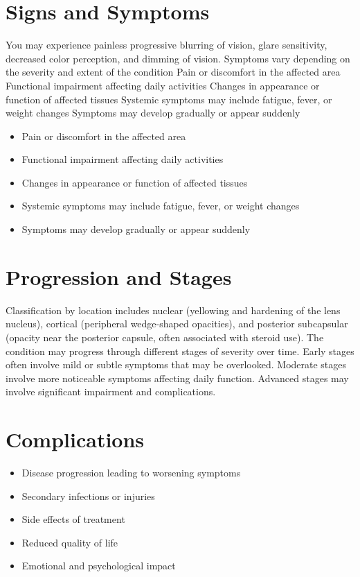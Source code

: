 \section{Signs and Symptoms}
You may experience painless progressive blurring of vision, glare sensitivity, decreased color perception, and dimming of vision. Symptoms vary depending on the severity and extent of the condition Pain or discomfort in the affected area Functional impairment affecting daily activities Changes in appearance or function of affected tissues Systemic symptoms may include fatigue, fever, or weight changes Symptoms may develop gradually or appear suddenly

\begin{itemize}[noitemsep]
  \item Pain or discomfort in the affected area
  \item Functional impairment affecting daily activities
  \item Changes in appearance or function of affected tissues
  \item Systemic symptoms may include fatigue, fever, or weight changes
  \item Symptoms may develop gradually or appear suddenly
\end{itemize}
\section{Progression and Stages}
Classification by location includes nuclear (yellowing and hardening of the lens nucleus), cortical (peripheral wedge-shaped opacities), and posterior subcapsular (opacity near the posterior capsule, often associated with steroid use). The condition may progress through different stages of severity over time. Early stages often involve mild or subtle symptoms that may be overlooked. Moderate stages involve more noticeable symptoms affecting daily function. Advanced stages may involve significant impairment and complications.
\section{Complications}
\begin{itemize}[noitemsep]
  \item Disease progression leading to worsening symptoms
  \item Secondary infections or injuries
  \item Side effects of treatment
  \item Reduced quality of life
  \item Emotional and psychological impact
\end{itemize}
